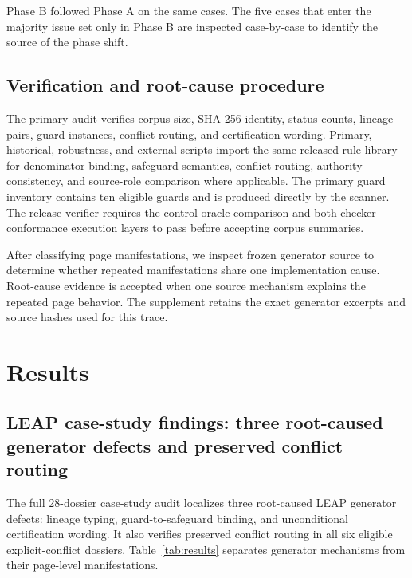 \documentclass[a4paper,fleqn]{cas-dc}
\begin{document}
Phase B followed Phase A on the same cases. The five cases that enter the majority issue set only in Phase B are inspected case-by-case to identify the source of the phase shift.

\subsection{Verification and root-cause procedure}
The primary audit verifies corpus size, SHA-256 identity, status counts, lineage pairs, guard instances, conflict routing, and certification wording. Primary, historical, robustness, and external scripts import the same released rule library for denominator binding, safeguard semantics, conflict routing, authority consistency, and source-role comparison where applicable. The primary guard inventory contains ten eligible guards and is produced directly by the scanner. The release verifier requires the control-oracle comparison and both checker-conformance execution layers to pass before accepting corpus summaries.

After classifying page manifestations, we inspect frozen generator source to determine whether repeated manifestations share one implementation cause. Root-cause evidence is accepted when one source mechanism explains the repeated page behavior. The supplement retains the exact generator excerpts and source hashes used for this trace.
\section{Results}
\subsection{LEAP case-study findings: three root-caused generator defects and preserved conflict routing}
The full 28-dossier case-study audit localizes three root-caused LEAP generator defects: lineage typing, guard-to-safeguard binding, and unconditional certification wording. It also verifies preserved conflict routing in all six eligible explicit-conflict dossiers. Table~\ref{tab:results} separates generator mechanisms from their page-level manifestations.
\end{document}
